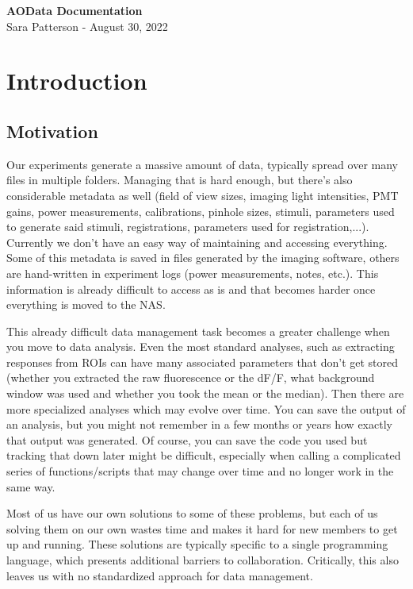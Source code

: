 \documentclass[10pt]{exam}
\begin{document}
	\noindent 
	\begin{center}
		{\LARGE\textbf{AOData Documentation}}
		\\\vspace{1.5ex}
		{\large Sara Patterson - August 30, 2022}
	\end{center}
	
	\tableofcontents
	\pagebreak 

\section{Introduction}
	\subsection{Motivation}
		\noindent Our experiments generate a massive amount of data, typically spread over many files in multiple folders. Managing that is hard enough, but there's also considerable metadata as well (field of view sizes, imaging light intensities, PMT gains, power measurements, calibrations, pinhole sizes, stimuli, parameters used to generate said stimuli, registrations, parameters used for registration,...). Currently we don't have an easy way of maintaining and accessing everything. Some of this metadata is saved in files generated by the imaging software, others are hand-written in experiment logs (power measurements, notes, etc.). This information is already difficult to access as is and that becomes harder once everything is moved to the NAS. 
		
		This already difficult data management task becomes a greater challenge when you move to data analysis. Even the most standard analyses, such as extracting responses from ROIs can have many associated parameters that don't get stored (whether you extracted the raw fluorescence or the dF/F, what background window was used and whether you took the mean or the median). Then there are more specialized analyses which may evolve over time. You can save the output of an analysis, but you might not remember in a few months or years how exactly that output was generated. Of course, you can save the code you used but tracking that down later might be difficult, especially when calling a complicated series of functions/scripts that may change over time and no longer work in the same way.
		
		Most of us have our own solutions to some of these problems, but each of us solving them on our own wastes time and makes it hard for new members to get up and running. These solutions are typically specific to a single programming language, which presents additional barriers to collaboration. Critically, this also leaves us with no standardized approach for data management. 
		
\end{document}
